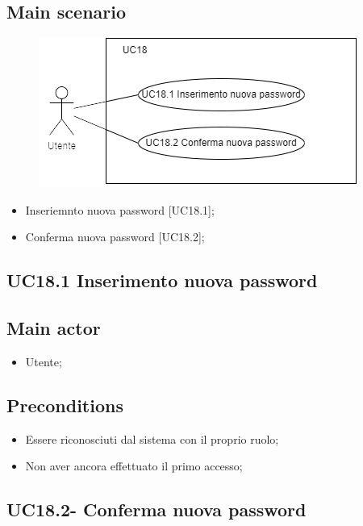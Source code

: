 \documentclass{article}
\begin{document}
     \subsection*{Main scenario}
        \begin{figure}[h]
          \centering
          \includegraphics{./imgUML/UC18-zoom.png}
          \label{fig:immagine}
        \end{figure}
        
        \begin{itemize}
            \item Inseriemnto nuova password [UC18.1];
            \item Conferma nuova password [UC18.2];
        \end{itemize}

        \subsection{UC18.1 Inserimento nuova password}
            \subsection*{Main actor}
        \begin{itemize}
            \item Utente;
        \end{itemize}
        
    \subsection*{Preconditions}
        \begin{itemize}
            \item Essere riconosciuti dal sistema con il proprio ruolo;
            \item Non aver ancora effettuato il primo accesso;
        \end{itemize}

    \subsection{UC18.2- Conferma nuova password}
\end{document}
